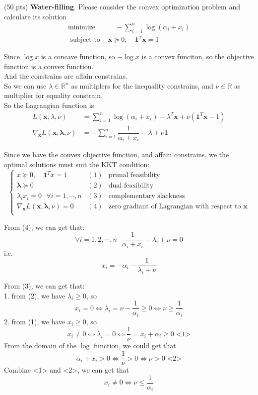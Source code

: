 \item {\color{red} (50 pts)} \textbf{Water-filling}. Please consider the convex optimization problem and calculate its solution
$$
\begin{aligned}
\text {minimize \ \ \ \ \ } & \quad-\sum_{i=1}^n \log \left(\alpha_i+x_i\right) \\
\text { subject to \ \ \ \ \ } & \mathbf{x} \succeq 0, \quad \mathbf{1}^T \mathbf{x}=1
\end{aligned}
$$

\solution{}
Since $\log x$ is a concave function, so $-\log x$ is a convex funciton, so the objective function is a convex function.\\
And the constrains are affain constrains.\\
So we can use $\lambda\in\mathbb{R}^n$ as multiplers for the inequality constrains, and $\nu\in\mathbb{R}$ as multiplier for equality constrain.\\
So the Lagrangian function is
\begin{align*}
    L(\mathbf{x},\lambda, \nu) &= \sum_{i=1}^n\log(\alpha_i+x_i)-\lambda^T\mathbf{x}+\nu(\mathbf{1}^T\mathbf{x}-1)\\
    \nabla_{\mathbf{x}} L(\mathbf{x},\mathbf{\lambda},\nu) &=-\sum_{i=1}^n\dfrac{1}{\alpha_i+x_i}-\lambda+\nu\mathbf{1}
\end{align*}

Since we have the convex objective function, and affain constrains, we the optimal solutions must suit the KKT condition:
$$
\left\{\begin{array}{ccc}
x \succeq 0, \quad \mathbf{1}^T x=1 & (1) & \text{primal feasibility} \\
\mathbf{\lambda} \succeq 0 & (2) & \text{dual feasibility} \\
\lambda_ix_i=0  \ \ \ \forall i=1,\cdots,n & (3) & \text{complementary slackness} \\
\nabla_{\mathbf{x}} L(\mathbf{x},\mathbf{\lambda},\nu)=0 & (4) & \text{zero gradiant of Lagrangian with respect to }\mathbf{x} \\
\end{array}\right.
$$

From (4), we can get that:
$$\forall i=1,2,\cdots,n\ \ \ \dfrac{1}{\alpha_i+x_i}-\lambda_i+\nu=0$$
i.e. $$x_i=-\alpha_i-\dfrac{1}{\lambda_i+\nu}$$

From (3), we can get that:\\
1. from (2), we have $\lambda_i\geq 0$, so
$$x_i=0 \Leftrightarrow \lambda_i=\nu-\dfrac{1}{\alpha_i} \geq 0 \Leftrightarrow \nu\geq\dfrac{1}{\alpha_i}$$
2. from (1), we have $x_i\geq 0$, so
$$x_i\neq 0 \Leftrightarrow \lambda_i=0 \Leftrightarrow \dfrac{1}{\nu}=x_i+\alpha_i\geq 0 \text{\ \ \ \ \ \ <1>}$$
From the domain of the $\log$ function, we could get that 
$$\alpha_i+x_i>0 \Leftrightarrow \dfrac{1}{\nu} > 0 \Leftrightarrow \nu > 0 \text{\ \ \ \ \ \ \ \ \ \ \ \ \ <2>}$$
Combine <1> and <2>, we can get that 
$$x_i\neq 0 \Leftrightarrow \nu\leq\dfrac{1}{\alpha_i}$$

